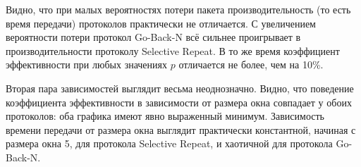 
Видно, что при малых вероятностях потери пакета производительность (то есть время передачи) протоколов практически не отличается. С увеличением вероятности потери протокол Go-Back-N всё сильнее проигрывает в производительности протоколу Selective Repeat. В то же время коэффициент эффективности при любых значениях $p$ отличается не более, чем на 10\%.

Вторая пара зависимостей выглядит весьма неоднозначно. Видно, что поведение коэффициента эффективности в зависимости от размера окна совпадает у обоих протоколов: оба графика имеют явно выраженный минимум. Зависимость времени передачи от размера окна выглядит практически константной, начиная с размера окна 5, для протокола Selective Repeat, и хаотичной для протокола Go-Back-N.